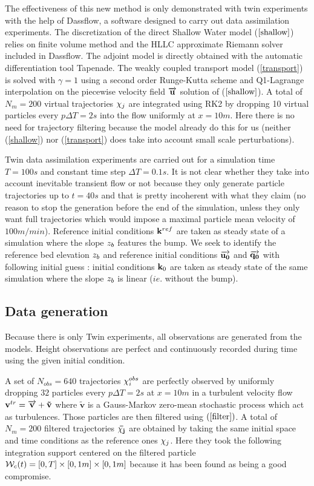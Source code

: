 The effectiveness of this new method is only demonstrated with twin experiments with the help of Dassflow,
a software designed to carry out data assimilation experiments.
The discretization of the direct Shallow Water model ($\ref{shallow}$) relies on finite volume method and the HLLC approximate Riemann solver included in Dassflow.
The adjoint model is directly obtained with the automatic differentiation tool Tapenade.
The weakly coupled transport model (\ref{transport}) is solved with $\gamma = 1$ using a second order Runge-Kutta scheme and Q1-Lagrange interpolation on the piecewise velocity field $\overrightarrow{\mathbf{u}}$ solution of ($\ref{shallow}$).
A total of $N_m = 200$ virtual trajectories $\mathbf{\chi}_j$ are integrated using RK2 by dropping 10 virtual particles every $p\Delta T = 2s$ into the flow uniformly at $x=10m$.
Here there is no need for trajectory filtering because the model already do this for us (neither (\ref{shallow}) nor (\ref{transport}) does take into account small scale perturbations).


\vskip 0.3cm
Twin data assimilation experiments are carried out for a simulation time $T = 100s$ and constant time step $\Delta T = 0.1s$. It is not clear whether they take into account inevitable transient flow or not because they only generate particle trajectories up to $t = 40s$ and that is pretty incoherent with what they claim (no reason to stop the generation before the end of the simulation, unless they only want full trajectories which would impose a maximal particle mean velocity of $100m/min$).
Reference initial conditions $\mathbf{k}^{ref}$ are taken as steady state of a simulation where the slope $z_b$ features the bump.
We seek to identify the reference bed elevation $z_b$ and reference initial conditions $\overrightarrow{\mathbf{u_0}}$ and $\overrightarrow{\mathbf{q_0}}$ with following initial guess :
initial conditions $\mathbf{k}_0$ are taken as steady state of the same simulation where the slope $z_b$ is linear ($ie.$ without the bump).

\subsection{Data generation}

Because there is only Twin experiments, all observations are generated from the models.
Height observations are perfect and continuously recorded during time using the given initial condition.

\vskip 0.3cm
A set of $N_{obs} = 640$ trajectories $\mathbf{\chi}_i^{obs}$ are perfectly observed by uniformly dropping $32$ particles every $p\Delta T = 2s$ at $x = 10m$ in a turbulent velocity flow $\mathbf{v}^{tr} = \overrightarrow{\mathbf{v}} + \mathbf{\tilde{v}}$ where $\mathbf{\tilde{v}}$ is a Gauss-Markov zero-mean stochastic process which act as turbulences. 
Those particles are then filtered using $(\ref{filter})$. A total of $N_m = 200$ filtered trajectories $\mathbf{\bar{\chi_j}}$ are obtained by taking the same initial space and time conditions as the reference ones $\mathbf{\chi}_j$. Here they took the following integration support centered on the filtered particle $\mathcal{W}_c(t) = [0,T] \times [0,1m] \times [0,1m]$ because it has been found as being a good compromise.


